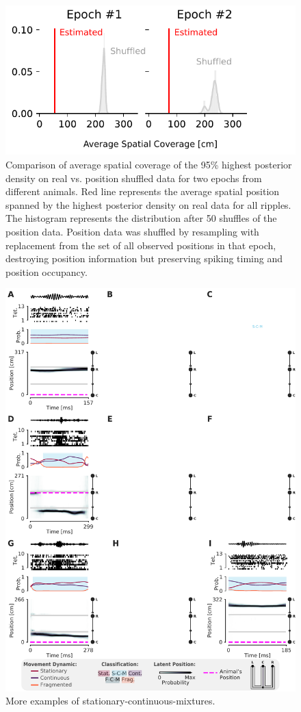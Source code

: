 \documentclass[times, twoside]{zHenriquesLab-StyleBioRxiv}
\begin{document}
\begin{figure}%
\centering
\includegraphics[width=0.80\linewidth]{figures/Figure4-supplemental1/Figure4_v1-supplemental1}
\caption{Comparison of average spatial coverage of the 95\% highest posterior density on real vs. position shuffled data for two epochs from different animals. Red line represents the average spatial position spanned by the highest posterior density on real data for all ripples. The histogram represents the distribution after 50 shuffles of the position data. Position data was shuffled by resampling with replacement from the set of all observed positions in that epoch, destroying position information but preserving spiking timing and position occupancy.}
\label{fig:Figure4-Figure supplement 1}
\end{figure}

\begin{figure}%
\centering
\includegraphics[width=0.80\linewidth]{figures/Figure5-supplemental1/Figure5_v1_supplemental1.pdf}
\caption{More examples of stationary-continuous-mixtures.}
\label{fig:Figure5-Figure supplement 1}
\end{figure}
\end{document}
